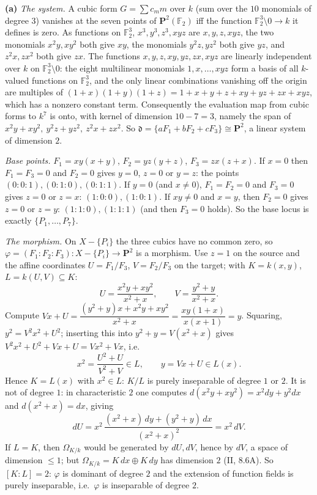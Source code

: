 \documentclass[11pt]{article}
\begin{document}
\textbf{(a)} \emph{The system.} A cubic form $G=\sum c_m m$ over $k$ (sum over the $10$ monomials of degree $3$) vanishes at the seven points of $\mathbf P^2(\mathbb F_2)$ iff the function $\mathbb F_2^3\setminus0\to k$ it defines is zero. As functions on $\mathbb F_2^3$, $x^3,y^3,z^3,xyz$ are $x,y,z,xyz$, the two monomials $x^2y,xy^2$ both give $xy$, the monomials $y^2z,yz^2$ both give $yz$, and $z^2x,zx^2$ both give $zx$. The functions $x,y,z,xy,yz,zx,xyz$ are linearly independent over $k$ on $\mathbb F_2^3\setminus0$: the eight multilinear monomials $1,x,\dots,xyz$ form a basis of all $k$-valued functions on $\mathbb F_2^3$, and the only linear combinations vanishing off the origin are multiples of $(1+x)(1+y)(1+z)=1+x+y+z+xy+yz+zx+xyz$, which has a nonzero constant term. Consequently the evaluation map from cubic forms to $k^7$ is onto, with kernel of dimension $10-7=3$, namely the span of $x^2y+xy^2,\ y^2z+yz^2,\ z^2x+zx^2$. So $\mathfrak d=\{aF_1+bF_2+cF_3\}\cong\mathbf P^2$, a linear system of dimension $2$.

\emph{Base points.} $F_1=xy(x+y)$, $F_2=yz(y+z)$, $F_3=zx(z+x)$. If $x=0$ then $F_1=F_3=0$ and $F_2=0$ gives $y=0$, $z=0$ or $y=z$: the points $(0:0:1),(0:1:0),(0:1:1)$. If $y=0$ (and $x\ne0$), $F_1=F_2=0$ and $F_3=0$ gives $z=0$ or $z=x$: $(1:0:0),(1:0:1)$. If $xy\ne0$ and $x=y$, then $F_2=0$ gives $z=0$ or $z=y$: $(1:1:0),(1:1:1)$ (and then $F_3=0$ holds). So the base locus is exactly $\{P_1,\dots,P_7\}$.

\emph{The morphism.} On $X-\{P_i\}$ the three cubics have no common zero, so $\varphi=(F_1:F_2:F_3):X-\{P_i\}\to\mathbf P^2$ is a morphism. Use $z=1$ on the source and the affine coordinates $U=F_1/F_3$, $V=F_2/F_3$ on the target; with $K=k(x,y)$, $L=k(U,V)\subseteq K$:
\[
U=\frac{x^2y+xy^2}{x^2+x},\qquad V=\frac{y^2+y}{x^2+x}.
\]
Compute $Vx+U=\dfrac{(y^2+y)x+x^2y+xy^2}{x^2+x}=\dfrac{xy(1+x)}{x(x+1)}=y$. Squaring, $y^2=V^2x^2+U^2$; inserting this into $y^2+y=V(x^2+x)$ gives $V^2x^2+U^2+Vx+U=Vx^2+Vx$, i.e.
\[
x^2=\frac{U^2+U}{V^2+V}\in L,\qquad y=Vx+U\in L(x).
\]
Hence $K=L(x)$ with $x^2\in L$: $K/L$ is purely inseparable of degree $1$ or $2$. It is not of degree $1$: in characteristic $2$ one computes $d(x^2y+xy^2)=x^2dy+y^2dx$ and $d(x^2+x)=dx$, giving
\[
dU=x^2\,\frac{(x^2+x)\,dy+(y^2+y)\,dx}{(x^2+x)^2}=x^2\,dV .
\]
If $L=K$, then $\Omega_{K/k}$ would be generated by $dU,dV$, hence by $dV$, a space of dimension $\le1$; but $\Omega_{K/k}=K\,dx\oplus K\,dy$ has dimension $2$ (II, 8.6A). So $[K:L]=2$: $\varphi$ is dominant of degree $2$ and the extension of function fields is purely inseparable, i.e.\ $\varphi$ is inseparable of degree $2$.
\end{document}
